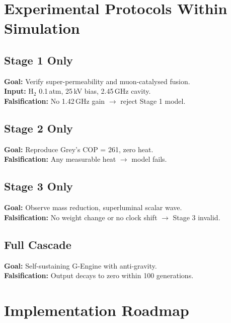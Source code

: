 \documentclass[11pt]{article}
\begin{document}
\section{Experimental Protocols Within Simulation}

\subsection{Stage 1 Only}
\textbf{Goal:} Verify super-permeability and muon-catalysed fusion. \\
\textbf{Input:} H$_2$ 0.1\,atm, 25\,kV bias, 2.45\,GHz cavity. \\
\textbf{Falsification:} No 1.42\,GHz gain $\to$ reject Stage 1 model.

\subsection{Stage 2 Only}
\textbf{Goal:} Reproduce Grey's COP = 261, zero heat. \\
\textbf{Falsification:} Any measurable heat $\to$ model fails.

\subsection{Stage 3 Only}
\textbf{Goal:} Observe mass reduction, superluminal scalar wave. \\
\textbf{Falsification:} No weight change or no clock shift $\to$ Stage 3 invalid.

\subsection{Full Cascade}
\textbf{Goal:} Self-sustaining G-Engine with anti-gravity. \\
\textbf{Falsification:} Output decays to zero within 100 generations.

\section{Implementation Roadmap}
\end{document}
